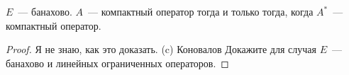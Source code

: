 
\begin{theorem}[Шаудера]
$E$~--- банахово. $A$~--- компактный оператор тогда и только тогда, когда $A^*$~--- компактный оператор.
\end{theorem}

\begin{proof}
Я не знаю, как это доказать. (c) Коновалов
Докажите для случая $E$~--- банахово и линейных ограниченных операторов.
\end{proof}